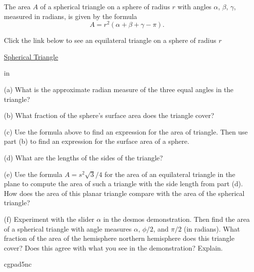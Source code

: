 \documentclass{ximera}
\newcommand{\pskip}{\vskip 0.1 in}
\begin{document}
\begin{question} \label{Q999:Radians}
The area $A$ of a spherical triangle on a sphere of radius $r$ with angles $\alpha$, $\beta$, $\gamma$, measured in radians, is given by the formula
\[
 A = r^2 (\alpha+\beta+\gamma - \pi) .
\]

Click the link below to see an equilateral triangle on a sphere of radius $r$

\href{https://www.desmos.com/3d/91881c3088}{Spherical Triangle}

\pskip

(a) What is the approximate radian measure of the three equal angles in the triangle?

(b) What fraction of the sphere's surface area does the triangle cover?

(c) Use the formula above to find an expression for the area of triangle. Then use part (b) to find an expression for the surface area of a sphere.

(d) What are the lengths of the sides of the triangle?

(e) Use the formula $A=s^2\sqrt{3}/4$ for the area of an equilateral triangle in the plane to compute the area of such a triangle with the side length from part (d). How does the area of this planar triangle compare with the area of the spherical triangle?

(f) Experiment with the slider $\alpha$ in the desmos demonstration. Then find the area of a spherical triangle with angle measures $\alpha$, $\phi/2$, and $\pi/2$ (in radians). What fraction of the area of the hemisphere northern hemisphere does this triangle cover? Does this agree with what you see in the demonstration? Explain.

\end{question}






cgpad5nc


\begin{exploration}  \label{Q57:Radians}

 
\begin{onlineOnly}
    \begin{center}
\end{center}
\end{onlineOnly}
\end{exploration}
\end{document}
